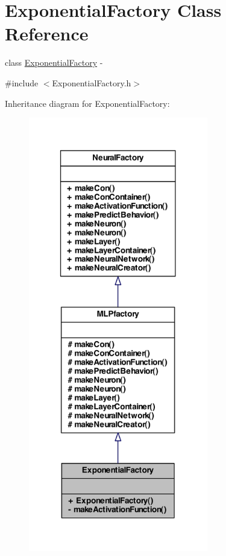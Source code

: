 \hypertarget{class_exponential_factory}{
\section{ExponentialFactory Class Reference}
\label{class_exponential_factory}
}


class \hyperlink{class_exponential_factory}{ExponentialFactory} -\/  




{\ttfamily \#include $<$ExponentialFactory.h$>$}



Inheritance diagram for ExponentialFactory:
\nopagebreak
\begin{figure}[H]
\begin{center}
\leavevmode
\includegraphics[width=222pt]{class_exponential_factory__inherit__graph}
\end{center}
\end{figure}


